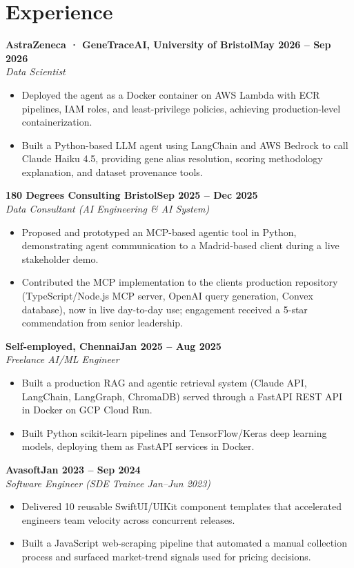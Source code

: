 \documentclass[a4paper,10pt]{article}
\newcommand{\entry}[4]{\noindent\textbf{#1}\hfill\textbf{#2}\\ \textit{#3}\hfill\textit{#4}\par}
\begin{document}
\section{Experience}
\entry{AstraZeneca · GeneTraceAI, University of Bristol}{May 2026 – Sep 2026}{Data Scientist}{}
\begin{itemize}
  \item Deployed the agent as a Docker container on AWS Lambda with ECR pipelines, IAM roles, and least-privilege policies, achieving production-level containerization.
  \item Built a Python-based LLM agent using LangChain and AWS Bedrock to call Claude Haiku 4.5, providing gene alias resolution, scoring methodology explanation, and dataset provenance tools.
\end{itemize}
\vspace{3pt}
\entry{180 Degrees Consulting Bristol}{Sep 2025 – Dec 2025}{Data Consultant (AI Engineering \& AI System)}{}
\begin{itemize}
  \item Proposed and prototyped an MCP-based agentic tool in Python, demonstrating agent communication to a Madrid-based client during a live stakeholder demo.
  \item Contributed the MCP implementation to the client\textquotesingle{}s production repository (TypeScript/Node.js MCP server, OpenAI query generation, Convex database), now in live day-to-day use; engagement received a 5-star commendation from senior leadership.
\end{itemize}
\vspace{3pt}
\entry{Self-employed, Chennai}{Jan 2025 – Aug 2025}{Freelance AI/ML Engineer}{}
\begin{itemize}
  \item Built a production RAG and agentic retrieval system (Claude API, LangChain, LangGraph, ChromaDB) served through a FastAPI REST API in Docker on GCP Cloud Run.
  \item Built Python scikit-learn pipelines and TensorFlow/Keras deep learning models, deploying them as FastAPI services in Docker.
\end{itemize}
\vspace{3pt}
\entry{Avasoft}{Jan 2023 – Sep 2024}{Software Engineer (SDE Trainee Jan–Jun 2023)}{}
\begin{itemize}
  \item Delivered 10 reusable SwiftUI/UIKit component templates that accelerated engineers\textquotesingle{} team velocity across concurrent releases.
  \item Built a JavaScript web-scraping pipeline that automated a manual collection process and surfaced market-trend signals used for pricing decisions.
\end{itemize}
\end{document}
